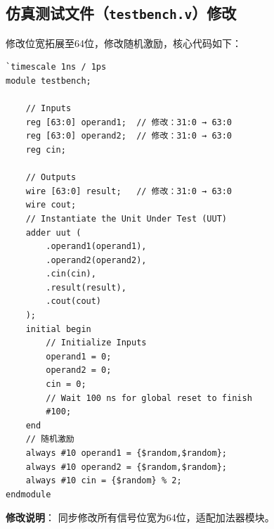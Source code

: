 \documentclass[12pt,a4paper,UTF8]{ctexart}
\begin{document}
\subsection{仿真测试文件（\texttt{testbench.v}）修改}
修改位宽拓展至64位，修改随机激励，核心代码如下：
\begin{lstlisting}
`timescale 1ns / 1ps  
module testbench;

    // Inputs
    reg [63:0] operand1;  // 修改：31:0 → 63:0
    reg [63:0] operand2;  // 修改：31:0 → 63:0
    reg cin;

    // Outputs
    wire [63:0] result;   // 修改：31:0 → 63:0
    wire cout;
    // Instantiate the Unit Under Test (UUT)
    adder uut (
        .operand1(operand1), 
        .operand2(operand2), 
        .cin(cin), 
        .result(result), 
        .cout(cout)
    );
    initial begin
        // Initialize Inputs
        operand1 = 0;
        operand2 = 0;
        cin = 0;
        // Wait 100 ns for global reset to finish
        #100;
    end
    // 随机激励
    always #10 operand1 = {$random,$random};  
    always #10 operand2 = {$random,$random}; 
    always #10 cin = {$random} % 2;
endmodule
\end{lstlisting}
\textbf{修改说明}：
同步修改所有信号位宽为64位，适配加法器模块。
\end{document}
